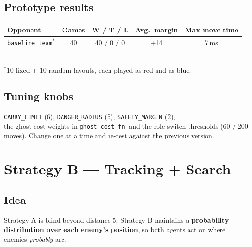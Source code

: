\documentclass[11pt,a4paper]{article}
\begin{document}
\subsection{Prototype results}
\begin{center}
\begin{tabular}{@{}lcccc@{}}
\toprule
Opponent & Games & W / T / L & Avg.\ margin & Max move time \\
\midrule
\texttt{baseline\_team}$^{*}$ & 40 & \textcolor{good}{40 / 0 / 0} & +14 & 7\,ms \\
\bottomrule
\end{tabular}\\[2pt]
{\footnotesize $^{*}$10 fixed + 10 random layouts, each played as red and as blue.}
\end{center}

\subsection{Tuning knobs}
\texttt{CARRY\_LIMIT} (6), \texttt{DANGER\_RADIUS} (5), \texttt{SAFETY\_MARGIN} (2),\\ the ghost cost
weights in \texttt{ghost\_cost\_fn}, and the role-switch thresholds (60 / 200 moves). Change one at a time
and re-test against the previous version.

\section{Strategy B --- Tracking + Search}

\subsection{Idea}
Strategy A is blind beyond distance 5. Strategy B maintains a \textbf{probability distribution over
each enemy's position}, so both agents act on where enemies \emph{probably} are.
\end{document}
